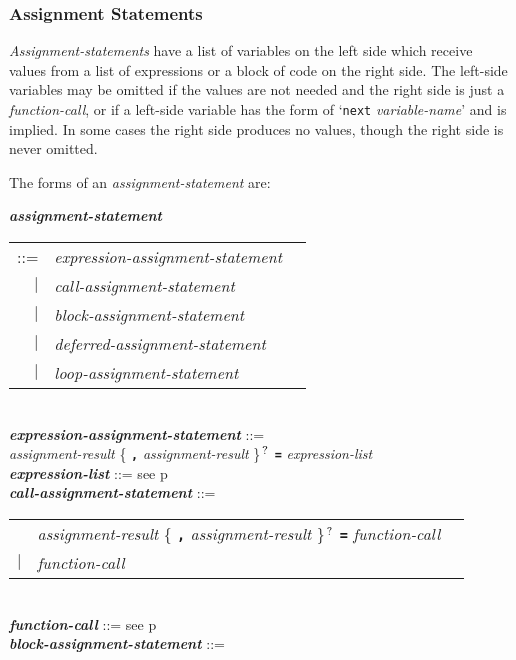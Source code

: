 \documentclass[12pt]{article}
\newcommand{\TT}[1]{{\tt \bfseries #1}}
\newcommand{\QMARK}{{$^{\,\mbox{\footnotesize ?}}$}}
\newcommand{\emkey}[1]{{\em \bfseries #1}}
\newcommand{\pagref}[1]{p\pageref{#1}}
\newenvironment{indpar}[1][0.3in]%
	{\begin{list}{}%
		     {\setlength{\itemsep}{0in}%
		      \setlength{\topsep}{0in}%
		      \setlength{\parsep}{1ex}%
		      \setlength{\labelwidth}{#1}%
		      \setlength{\leftmargin}{#1}%
		      \addtolength{\leftmargin}{\labelsep}}%
	 \item}%
	{\end{list}}
\begin{document}
\subsubsection{Assignment Statements}
\label{ASSIGNMENT-STATEMENTS}

{\em Assignment-statements} have a list of variables on the
left side which receive values from a list of expressions or
a block of code on the right side.  The left-side variables
may be omitted if the values are not needed and the right side
is just a {\em function-call}, or if a left-side variable
has the form of `{\tt next} {\em variable-name}' and is
implied.  In some cases
the right side produces no values, though the right side is never omitted.

The forms of an {\em assignment-statement} are:
\begin{indpar}
\emkey{assignment-statement}
    \begin{tabular}[t]{@{}rll}
    ::= & {\em expression-assignment-statement} \\
    $|$ & {\em call-assignment-statement} \\
    $|$ & {\em block-assignment-statement} \\
    $|$ & {\em deferred-assignment-statement} \\
    $|$ & {\em loop-assignment-statement} \\
    \end{tabular}
\\[0.5ex]
\emkey{expression-assignment-statement} ::= \\
\hspace*{0.5in} {\em assignment-result}
                \{ \TT{,} {\em assignment-result} \}\QMARK{}
		\TT{=} {\em expression-list}
\\[0.5ex]
\emkey{expression-list} ::= see \pagref{EXPRESSION-LIST}
\\[0.5ex]
\emkey{call-assignment-statement} ::= \\
\hspace*{0.5in}
    \begin{tabular}[t]{@{}rll}
        & {\em assignment-result}
                \{ \TT{,} {\em assignment-result} \}\QMARK{}
		\TT{=} {\em function-call} \\
    $|$ & {\em function-call} \\
    \end{tabular}
\\[0.5ex]
\emkey{function-call} ::= see \pagref{FUNCTION-CALLS}
\\[0.5ex]
\emkey{block-assignment-statement} ::= \\

\end{indpar}
\end{document}
